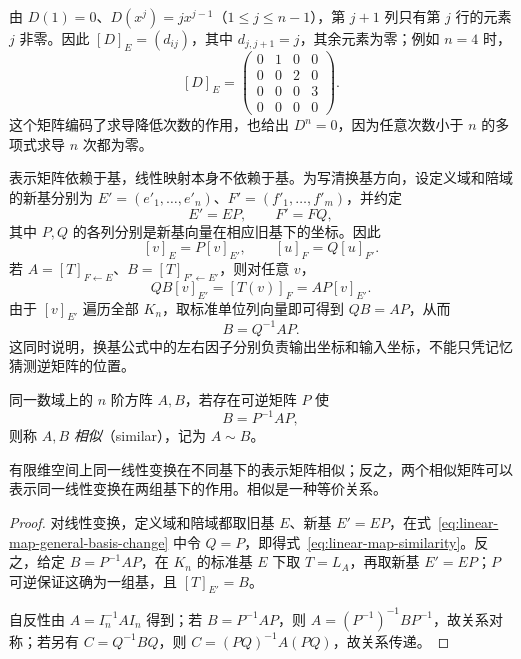 \begin{solve}
由 $D(1)=0$、$D(x^j)=jx^{j-1}$（$1\leq j\leq n-1$），第 $j+1$ 列只有第 $j$ 行的元素 $j$ 非零。因此 $[D]_E=(d_{ij})$，其中 $d_{j,j+1}=j$，其余元素为零；例如 $n=4$ 时，
\[
    [D]_E=\begin{pmatrix}
        0&1&0&0\\
        0&0&2&0\\
        0&0&0&3\\
        0&0&0&0
    \end{pmatrix}.
\]
这个矩阵编码了求导降低次数的作用，也给出 $D^n=0$，因为任意次数小于 $n$ 的多项式求导 $n$ 次都为零。
\end{solve}

表示矩阵依赖于基，线性映射本身不依赖于基。为写清换基方向，设定义域和陪域的新基分别为 $E'=(e'_1,\ldots,e'_n)$、$F'=(f'_1,\ldots,f'_m)$，并约定
\[
    E'=EP,\qquad F'=FQ,
\]
其中 $P,Q$ 的各列分别是新基向量在相应旧基下的坐标。因此
\[
    [v]_E=P[v]_{E'},\qquad [u]_F=Q[u]_{F'}.
\]
若 $A=[T]_{F\leftarrow E}$、$B=[T]_{F'\leftarrow E'}$，则对任意 $v$，
\[
    QB[v]_{E'}=[T(v)]_F=AP[v]_{E'}.
\]
由于 $[v]_{E'}$ 遍历全部 $K_n$，取标准单位列向量即可得到 $QB=AP$，从而
\begin{equation}
\label{eq:linear-map-general-basis-change}
    B=Q^{-1}AP.
\end{equation}
这同时说明，换基公式中的左右因子分别负责输出坐标和输入坐标，不能只凭记忆猜测逆矩阵的位置。

\begin{definition}
\label{def:matrix-similarity}
同一数域上的 $n$ 阶方阵 $A,B$，若存在可逆矩阵 $P$ 使
\begin{equation}
\label{eq:linear-map-similarity}
    B=P^{-1}AP,
\end{equation}
则称 $A,B$ \emph{相似}（similar），记为 $A\sim B$。
\end{definition}

\begin{theorem}
\label{thm:linear-map-similarity}
有限维空间上同一线性变换在不同基下的表示矩阵相似；反之，两个相似矩阵可以表示同一线性变换在两组基下的作用。相似是一种等价关系。
\end{theorem}

\begin{proof}
对线性变换，定义域和陪域都取旧基 $E$、新基 $E'=EP$，在式~\eqref{eq:linear-map-general-basis-change} 中令 $Q=P$，即得式~\eqref{eq:linear-map-similarity}。反之，给定 $B=P^{-1}AP$，在 $K_n$ 的标准基 $E$ 下取 $T=L_A$，再取新基 $E'=EP$；$P$ 可逆保证这确为一组基，且 $[T]_{E'}=B$。

自反性由 $A=I_n^{-1}AI_n$ 得到；若 $B=P^{-1}AP$，则 $A=(P^{-1})^{-1}BP^{-1}$，故关系对称；若另有 $C=Q^{-1}BQ$，则 $C=(PQ)^{-1}A(PQ)$，故关系传递。
\end{proof}

